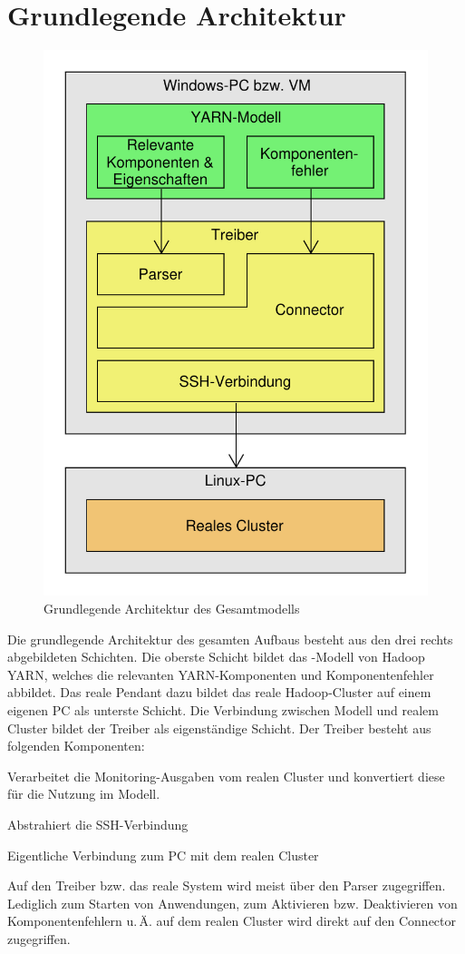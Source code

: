 \section{Grundlegende Architektur}\label{sec:architecture}

\begin{figure}
    \centering
    \includegraphics[width=0.5\columnwidth]{./images/modelArchitecture.pdf}
    \caption{Grundlegende Architektur des Gesamtmodells}
    \label{fig:modelArchitecture}
\end{figure}

Die grundlegende Architektur des gesamten Aufbaus besteht aus den drei rechts abgebildeten Schichten. Die oberste Schicht bildet das \sS-Modell von Hadoop YARN, welches die relevanten YARN-Komponenten und Komponentenfehler abbildet. Das reale Pendant dazu bildet das reale Hadoop-Cluster auf einem eigenen PC als unterste Schicht. Die Verbindung zwischen Modell und realem Cluster bildet der Treiber als eigenständige Schicht. Der Treiber besteht aus folgenden Komponenten:

\begin{description}[noitemsep]
    \item [Parser] Verarbeitet die Monitoring-Ausgaben vom realen Cluster und konvertiert diese für die Nutzung im Modell.
    \item [Connector] Abstrahiert die SSH-Verbindung
    \item [SSH-Verbindung] Eigentliche Verbindung zum PC mit dem realen Cluster
\end{description}

Auf den Treiber bzw. das reale System wird meist über den Parser zugegriffen. Lediglich zum Starten von Anwendungen, zum Aktivieren bzw. Deaktivieren von Komponentenfehlern u.\,Ä. auf dem realen Cluster wird direkt auf den Connector zugegriffen.